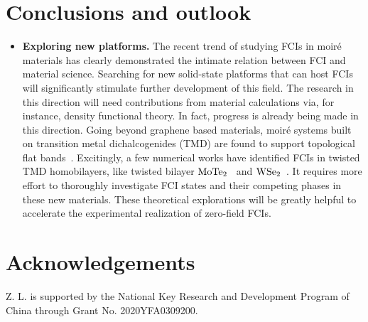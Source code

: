 \documentclass[a4paper,fleqn]{cas-sc}
\begin{document}
\section{Conclusions and outlook}

\begin{itemize}

\item
{\bf Exploring new platforms.}
The recent trend of studying FCIs in moir\'e materials has clearly demonstrated the intimate relation between FCI and material science. Searching for new solid-state platforms that can host FCIs will significantly stimulate further development of this field. The research in this direction will need contributions from material calculations via, for instance, density functional theory. In fact, progress is already being made in this direction. Going beyond graphene based materials, moir\'e systems built on transition metal dichalcogenides (TMD) are found to support topological flat bands~\cite{TMD_Wu2019,TMD_DasSarma2020,Li2021,TMD_Fu2021,TMD_Fu2021_2,TMD_DasSarma2021,TMD_Zhou2022}. Excitingly, a few numerical works have identified FCIs in twisted TMD homobilayers, like twisted bilayer ${\rm MoTe}_2$~\cite{TMDFCI_Li2021} and ${\rm WSe}_2$~\cite{FCITMD_Fu}. It requires more effort to thoroughly investigate FCI states and their competing phases in these new materials. These theoretical explorations will be greatly helpful to accelerate the experimental realization of zero-field FCIs.

\end{itemize}

\section{Acknowledgements}
Z. L. is supported by the National Key Research and Development Program of China through Grant No. 2020YFA0309200.



\end{document}
